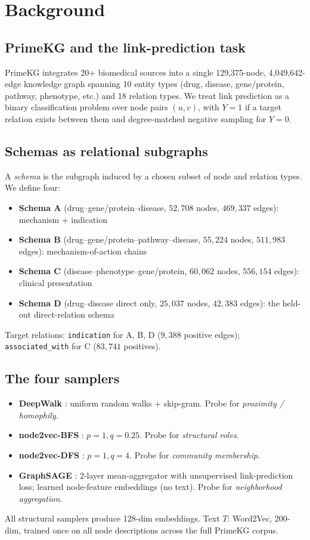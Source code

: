 \documentclass[11pt]{article}
\begin{document}
\section{Background}
\label{sec:background}
\subsection{PrimeKG and the link-prediction task}
PrimeKG \cite{primekg2023} integrates 20+ biomedical sources into a single 129{,}375-node, 4{,}049{,}642-edge knowledge graph spanning 10 entity types (drug, disease, gene/protein, pathway, phenotype, etc.) and 18 relation types. We treat link prediction as a binary classification problem over node pairs $(u,v)$, with $Y=1$ if a target relation exists between them and degree-matched negative sampling for $Y=0$.

\subsection{Schemas as relational subgraphs}
A \emph{schema} is the subgraph induced by a chosen subset of node and relation types. We define four:
\begin{itemize}
\item \textbf{Schema A} (drug--gene/protein--disease, $52{,}708$ nodes, $469{,}337$ edges): mechanism + indication
\item \textbf{Schema B} (drug--gene/protein--pathway--disease, $55{,}224$ nodes, $511{,}983$ edges): mechanism-of-action chains
\item \textbf{Schema C} (disease--phenotype--gene/protein, $60{,}062$ nodes, $556{,}154$ edges): clinical presentation
\item \textbf{Schema D} (drug--disease direct only, $25{,}037$ nodes, $42{,}383$ edges): the held-out direct-relation schema
\end{itemize}
Target relations: \texttt{indication} for A, B, D ($9{,}388$ positive edges); \texttt{associated\_with} for C ($83{,}741$ positives).

\subsection{The four samplers}
\begin{itemize}
\item \textbf{DeepWalk} \cite{deepwalk}: uniform random walks + skip-gram. Probe for \emph{proximity / homophily}.
\item \textbf{node2vec-BFS} \cite{node2vec}: $p{=}1, q{=}0.25$. Probe for \emph{structural roles}.
\item \textbf{node2vec-DFS} \cite{node2vec}: $p{=}1, q{=}4$. Probe for \emph{community membership}.
\item \textbf{GraphSAGE} \cite{graphsage}: 2-layer mean-aggregator with unsupervised link-prediction loss; learned node-feature embeddings (no text). Probe for \emph{neighborhood aggregation}.
\end{itemize}
All structural samplers produce 128-dim embeddings. Text $T$: Word2Vec, $200$-dim, trained once on all node descriptions across the full PrimeKG corpus.
\end{document}
